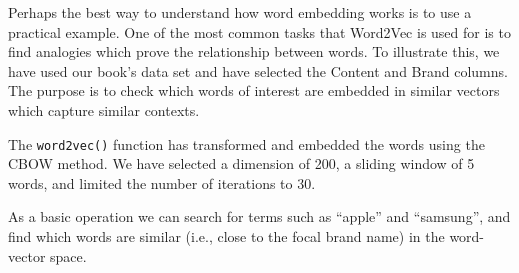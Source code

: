 Perhaps the best way to understand how word embedding works is to use a
practical example. One of the most common tasks that Word2Vec is used for is
to find analogies which prove the relationship between words. To
illustrate this, we have used our book's data set and have selected the Content and Brand columns. The purpose is to check which words
of interest are embedded in similar vectors which capture similar
contexts.

\begin{Shaded}
\begin{Highlighting}[]

\OtherTok{\textless{}{-}} \NormalTok{(}\NormalTok{, }
                      \NormalTok{(}\NormalTok{, }\NormalTok{))}
\end{Highlighting}
\end{Shaded}

The \texttt{word2vec()} function has transformed and embedded the words using the CBOW method. We have selected a dimension of 200, a
sliding window of 5 words, and limited the number of iterations to 30.

\begin{Shaded}
\begin{Highlighting}[]
\OtherTok{\textless{}{-}} \NormalTok{(} \SpecialCharTok{$} \NormalTok{, } \NormalTok{, }\NormalTok{, } \NormalTok{)}
\end{Highlighting}
\end{Shaded}

As a basic operation we can search for terms such as ``apple'' and
``samsung'', and find which words are similar (i.e., close to the focal
brand name) in the word-vector space.

\begin{Shaded}
\begin{Highlighting}[]
\OtherTok{\textless{}{-}} \NormalTok{(}\NormalTok{), } \NormalTok{, } \NormalTok{)}
\end{Highlighting}
\end{Shaded}

